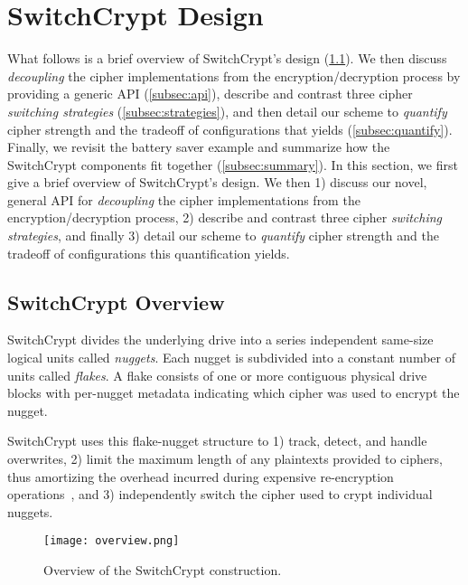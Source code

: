 \section{SwitchCrypt Design} \label{sec:design}

What follows is a brief overview of SwitchCrypt's design
(\cref{subsec:overview}). We then discuss \emph{decoupling} the cipher
implementations from the encryption/decryption process by providing a generic
API (\cref{subsec:api}), describe and contrast three cipher \emph{switching
strategies} (\cref{subsec:strategies}), and then detail our scheme to
\emph{quantify} cipher strength and the tradeoff of configurations that yields
(\cref{subsec:quantify}). Finally, we revisit the battery saver example and
summarize how the SwitchCrypt components fit together (\cref{subsec:summary}).
In this section, we first give a brief overview of SwitchCrypt's design. We then
1) discuss our novel, general API for \emph{decoupling} the cipher
implementations from the encryption/decryption process, 2) describe and contrast
three cipher \emph{switching strategies}, and finally 3) detail our scheme to
\emph{quantify} cipher strength and the tradeoff of configurations this
quantification yields.

\subsection{SwitchCrypt Overview}\label{subsec:overview}

SwitchCrypt divides the underlying drive into a series independent same-size
logical units called \emph{nuggets}. Each nugget is subdivided into a constant
number of units called \emph{flakes}. A flake consists of one or more contiguous
physical drive  blocks with per-nugget metadata indicating which cipher was used
to encrypt the nugget.

SwitchCrypt uses this flake-nugget structure to 1) track, detect, and handle
overwrites, 2) limit the maximum length of any plaintexts provided to ciphers,
thus amortizing the overhead incurred during expensive re-encryption
operations~\cite{StrongBox}, and 3) independently switch the cipher used to
crypt individual nuggets.


\begin{figure}[ht]
   \centering
   \texttt{[image: overview.png]}
   \caption{Overview of the SwitchCrypt construction.}\label{fig:overview}
\end{figure}

